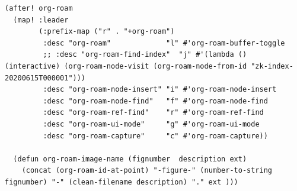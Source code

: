 \documentclass[11pt]{article}
\begin{document}
\begin{verbatim}
(after! org-roam
  (map! :leader
        (:prefix-map ("r" . "+org-roam")
         :desc "org-roam"             "l" #'org-roam-buffer-toggle
         ;; :desc "org-roam-find-index"  "j" #'(lambda () (interactive) (org-roam-node-visit (org-roam-node-from-id "zk-index-20200615T000001")))
         :desc "org-roam-node-insert" "i" #'org-roam-node-insert
         :desc "org-roam-node-find"   "f" #'org-roam-node-find
         :desc "org-roam-ref-find"    "r" #'org-roam-ref-find
         :desc "org-roam-ui-mode"     "g" #'org-roam-ui-mode
         :desc "org-roam-capture"     "c" #'org-roam-capture))

  (defun org-roam-image-name (fignumber  description ext)
    (concat (org-roam-id-at-point) "-figure-" (number-to-string fignumber) "-" (clean-filename description) "." ext )))
\end{verbatim}
\end{document}
